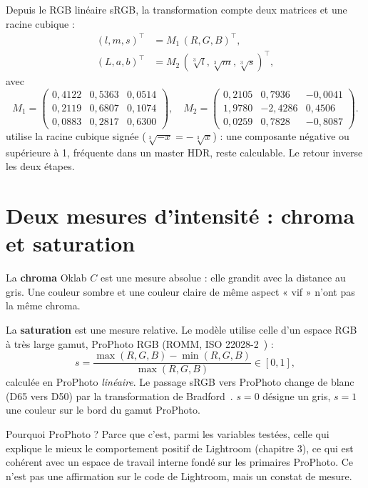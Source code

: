 Depuis le RGB linéaire sRGB, la transformation compte deux matrices et une
racine cubique :
\begin{align}
(l,m,s)^\top &= M_1\,(R,G,B)^\top,\\
(L,a,b)^\top &= M_2\,(\sqrt[3]{l},\sqrt[3]{m},\sqrt[3]{s})^\top,
\end{align}
avec
\begin{equation}
M_1=\begin{pmatrix}
0{,}4122 & 0{,}5363 & 0{,}0514\\
0{,}2119 & 0{,}6807 & 0{,}1074\\
0{,}0883 & 0{,}2817 & 0{,}6300\end{pmatrix},\quad
M_2=\begin{pmatrix}
0{,}2105 & 0{,}7936 & -0{,}0041\\
1{,}9780 & -2{,}4286 & 0{,}4506\\
0{,}0259 & 0{,}7828 & -0{,}8087\end{pmatrix}.
\end{equation}
\IPR{} utilise la racine cubique signée ($\sqrt[3]{-x}=-\sqrt[3]{x}$) : une
composante négative ou supérieure à 1, fréquente dans un master HDR, reste
calculable. Le retour inverse les deux étapes.

\section{Deux mesures d'intensité : chroma et saturation}
La \textbf{chroma} Oklab $C$ est une mesure absolue : elle grandit avec la
distance au gris. Une couleur sombre et une couleur claire de même aspect
« vif » n'ont pas la même chroma.

La \textbf{saturation} est une mesure relative. Le modèle utilise celle d'un
espace RGB à très large gamut, ProPhoto RGB (ROMM, ISO 22028-2~\cite{iso22028}) :
\begin{equation}
s=\frac{\max(R,G,B)-\min(R,G,B)}{\max(R,G,B)}\in[0,1],
\end{equation}
calculée en ProPhoto \emph{linéaire}. Le passage sRGB vers ProPhoto change de
blanc (D65 vers D50) par la transformation de Bradford~\cite{lam1985}.
$s=0$ désigne un gris, $s=1$ une couleur sur le bord du gamut ProPhoto.

Pourquoi ProPhoto ? Parce que c'est, parmi les variables testées, celle qui
explique le mieux le comportement positif de Lightroom (chapitre 3), ce qui
est cohérent avec un espace de travail interne fondé sur les primaires
ProPhoto. Ce n'est pas une affirmation sur le code de Lightroom, mais un
constat de mesure.

